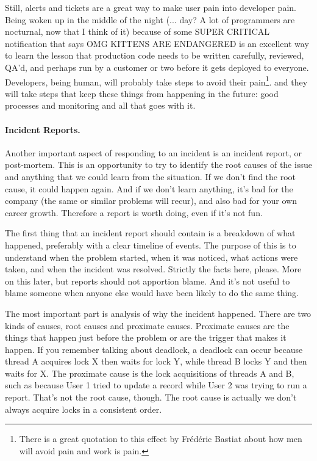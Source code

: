Still, alerts and tickets are a great way to make user pain into developer pain. Being woken up in the middle of the night (... day? A lot of programmers are nocturnal, now that I think of it) because of some SUPER CRITICAL notification that says OMG KITTENS ARE ENDANGERED is an excellent way to learn the lesson that production code needs to be written carefully, reviewed, QA'd, and perhaps run by a customer or two before it gets deployed to everyone. Developers, being human, will probably take steps to avoid their pain\footnote{There is a great quotation to this effect by Fr\'ed\'eric Bastiat about how men will avoid pain and work is pain.}. and they will take steps that keep these things from happening in the future: good processes and monitoring and all that goes with it.

\paragraph{Incident Reports.} 
Another important aspect of responding to an incident is an incident report, or post-mortem. This is an opportunity to try to identify the root causes of the issue and anything that we could learn from the situation.  If we don't find the root cause, it could happen again. And if we don't learn anything, it's bad for the company (the same or similar problems will recur), and also bad for your own career growth. Therefore a report is worth doing, even if it's not fun.

The first thing that an incident report should contain is a breakdown of what happened, preferably with a clear timeline of events. The purpose of this is to understand when the problem started, when it was noticed, what actions were taken, and when the incident was resolved. Strictly the facts here, please. More on this later, but reports should not apportion blame. And it's not useful to blame someone when anyone else would have been likely to do the same thing.

The most important part is analysis of why the incident happened. There are two kinds of causes, root causes and proximate causes. Proximate causes are the things that happen just before the problem or are the trigger that makes it happen. If you remember talking about deadlock, a deadlock can occur because thread A acquires lock X then waits for lock Y, while thread B locks Y and then waits for X. The proximate cause is the lock acquisitions of threads A and B, such as because User 1 tried to update a record while User 2 was trying to run a report. That's not the root cause, though. The root cause is actually we don't always acquire locks in a consistent order.

